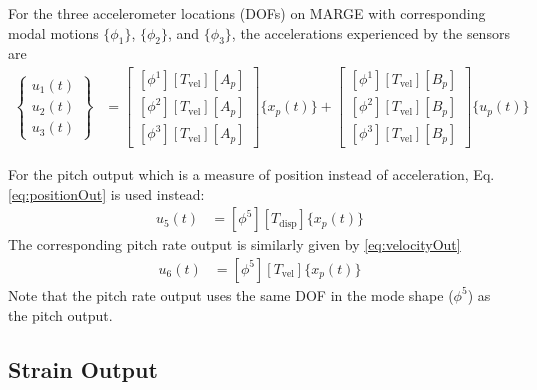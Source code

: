 For the three accelerometer locations (DOFs) on MARGE with corresponding modal motions $\{\phi_1\}$, $\{\phi_2\}$, and $\{\phi_3\}$, the accelerations experienced by the sensors are
\begin{align}
	\begin{Bmatrix} 	u_1(t) \\ u_2(t) \\ u_3(t) \end{Bmatrix}
	&= \begin{bmatrix}
		\left[ \phi^1 \right] [T_\text{vel}] [A_p] \\
		\left[ \phi^2 \right] [T_\text{vel}] [A_p] \\
		\left[ \phi^3 \right] [T_\text{vel}] [A_p]
	\end{bmatrix} \{x_p(t)\}
	+ \begin{bmatrix}
		\left[ \phi^1 \right] [T_\text{vel}] [B_p] \\
		\left[ \phi^2 \right] [T_\text{vel}] [B_p] \\
		\left[ \phi^3 \right] [T_\text{vel}] [B_p]
	\end{bmatrix} \{u_p(t)\}
\end{align}

For the pitch output which is a measure of position instead of acceleration, Eq. \ref{eq:positionOut} is used instead:
\begin{align}
	u_5(t) &= \left[ \phi^5 \right] [T_\text{disp}] \{x_p(t)\}
\end{align}
The corresponding pitch rate output is similarly given by \ref{eq:velocityOut}
\begin{align}
	u_6(t) &= \left[ \phi^5 \right] [T_\text{vel}] \{x_p(t)\}
\end{align}
Note that the pitch rate output uses the same DOF in the mode shape ($\phi^5$) as the pitch output.

\subsection{Strain Output}

